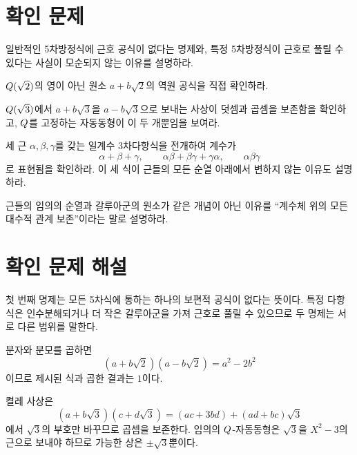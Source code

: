 \section{확인 문제}

\begin{exercise}
일반적인 5차방정식에 근호 공식이 없다는 명제와, 특정 5차방정식이 근호로 풀릴 수 있다는 사실이 모순되지 않는 이유를 설명하라.
\end{exercise}

\begin{exercise}
$Q(\sqrt2)$의 영이 아닌 원소 $a+b\sqrt2$의 역원 공식을 직접 확인하라.
\end{exercise}

\begin{exercise}
$Q(\sqrt3)$에서 $a+b\sqrt3$을 $a-b\sqrt3$으로 보내는 사상이 덧셈과 곱셈을 보존함을 확인하고, $Q$를 고정하는 자동동형이 이 두 개뿐임을 보여라.
\end{exercise}

\begin{exercise}
세 근 $\alpha,\beta,\gamma$를 갖는 일계수 3차다항식을 전개하여 계수가
\[
  \alpha+\beta+\gamma,\qquad
  \alpha\beta+\beta\gamma+\gamma\alpha,\qquad
  \alpha\beta\gamma
\]
로 표현됨을 확인하라. 이 세 식이 근들의 모든 순열 아래에서 변하지 않는 이유도 설명하라.
\end{exercise}

\begin{exercise}
근들의 임의의 순열과 갈루아군의 원소가 같은 개념이 아닌 이유를 ``계수체 위의 모든 대수적 관계 보존''이라는 말로 설명하라.
\end{exercise}

\section{확인 문제 해설}

\begin{solution}
첫 번째 명제는 모든 5차식에 통하는 하나의 보편적 공식이 없다는 뜻이다. 특정 다항식은 인수분해되거나 더 작은 갈루아군을 가져 근호로 풀릴 수 있으므로 두 명제는 서로 다른 범위를 말한다.
\end{solution}

\begin{solution}
분자와 분모를 곱하면
\[
  (a+b\sqrt2)(a-b\sqrt2)=a^2-2b^2
\]
이므로 제시된 식과 곱한 결과는 $1$이다.
\end{solution}

\begin{solution}
켤레 사상은
\[
  (a+b\sqrt3)(c+d\sqrt3)
  =(ac+3bd)+(ad+bc)\sqrt3
\]
에서 $\sqrt3$의 부호만 바꾸므로 곱셈을 보존한다. 임의의 $Q$-자동동형은 $\sqrt3$을 $X^2-3$의 근으로 보내야 하므로 가능한 상은 $\pm\sqrt3$뿐이다.
\end{solution}

